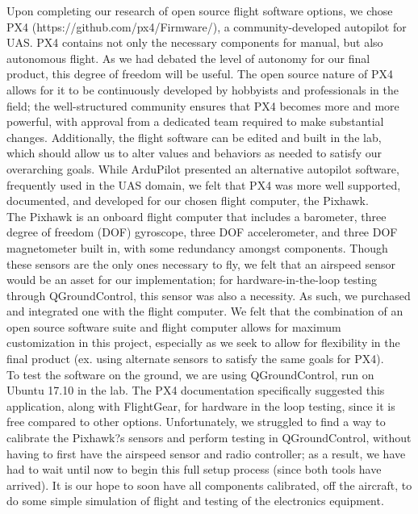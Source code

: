 ﻿\documentclass{article}
\begin{document}
\noindent Upon completing our research of open source flight software options, we chose PX4 (https://github.com/px4/Firmware/), a community-developed autopilot for UAS. PX4 contains not only the necessary components for manual, but also autonomous flight. As we had debated the level of autonomy for our final product, this degree of freedom will be useful. The open source nature of PX4 allows for it to be continuously developed by hobbyists and professionals in the field; the well-structured community ensures that PX4 becomes more and more powerful, with approval from a dedicated team required to make substantial changes. Additionally, the flight software can be edited and built in the lab, which should allow us to alter values and behaviors as needed to satisfy our overarching goals. While ArduPilot presented an alternative autopilot software, frequently used in the UAS domain, we felt that PX4 was more well supported, documented, and developed for our chosen flight computer, the Pixhawk. \\

\noindent The Pixhawk is an onboard flight computer that includes a barometer, three degree of freedom (DOF) gyroscope, three DOF accelerometer, and three DOF magnetometer built in, with some redundancy amongst components. Though these sensors are the only ones necessary to fly, we felt that an airspeed sensor would be an asset for our implementation; for hardware-in-the-loop testing through QGroundControl, this sensor was also a necessity. As such, we purchased and integrated one with the flight computer. We felt that the combination of an open source software suite and flight computer allows for maximum customization in this project, especially as we seek to allow for flexibility in the final product (ex. using alternate sensors to satisfy the same goals for PX4).\\

\noindent To test the software on the ground, we are using QGroundControl, run on Ubuntu 17.10 in the lab. The PX4 documentation specifically suggested this application, along with FlightGear, for hardware in the loop testing, since it is free compared to other options. Unfortunately, we struggled to find a way to calibrate the Pixhawk?s sensors and perform testing in QGroundControl, without having to first have the airspeed sensor and radio controller; as a result, we have had to wait until now to begin this full setup process (since both tools have arrived). It is our hope to soon have all components calibrated, off the aircraft, to do some simple simulation of flight and testing of the electronics equipment.\\
\end{document}
